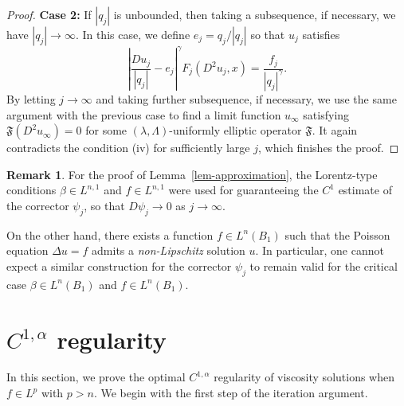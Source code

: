\documentclass[11pt]{amsart}
\theoremstyle{plain}
\theoremstyle{definition}
\newtheorem{remark}[theorem]{Remark}
\numberwithin{equation}{section}
\begin{document}
\begin{proof}
    \textbf{Case 2: }If $|q_j|$ is unbounded, then taking a subsequence, if necessary, we have $|q_j| \to \infty$. In this case, we define $e_j=q_j/|q_j|$ so that $u_j$ satisfies
    \begin{equation*}
        \left|\frac{Du_j}{|q_j|}-e_j\right|^{\gamma}F_j(D^2u_j, x)=\frac{f_j}{|q_j|^{\gamma}}.
    \end{equation*}
    By letting $j \to \infty$ and taking further subsequence, if necessary, we use the same
    argument with the previous case to find a limit function $u_{\infty}$ satisfying $\mathfrak{F}(D^2u_{\infty})=0$ for some $(\lambda, \Lambda)$-uniformly elliptic operator $\mathfrak{F}$. It again contradicts the condition (iv) for sufficiently large $j$, which finishes the proof.
\end{proof}


\begin{remark}
    For the proof of Lemma~\ref{lem-approximation}, the Lorentz-type conditions $\beta \in L^{n, 1}$ and $f \in L^{n, 1}$ were used for guaranteeing the $C^1$ estimate of the corrector $\psi_j$, so that $D\psi_j \to 0$ as $j\to \infty$. 
    
    On the other hand, there exists a function $f \in L^n(B_1)$ such that the Poisson equation $\Delta u=f$ admits a \emph{non-Lipschitz} solution $u$. In particular, one cannot expect a similar construction for the corrector $\psi_j$ to remain valid for the critical case $\beta \in L^n(B_1)$ and $f \in L^n(B_1)$. 
\end{remark}


\section{\texorpdfstring{$C^{1,\alpha}$}{C1a} regularity} \label{sec4}
In this section, we prove the optimal $C^{1, \alpha}$ regularity of viscosity solutions when $f \in L^p$ with $p>n$. We begin with the first step of the iteration argument.
\end{document}
